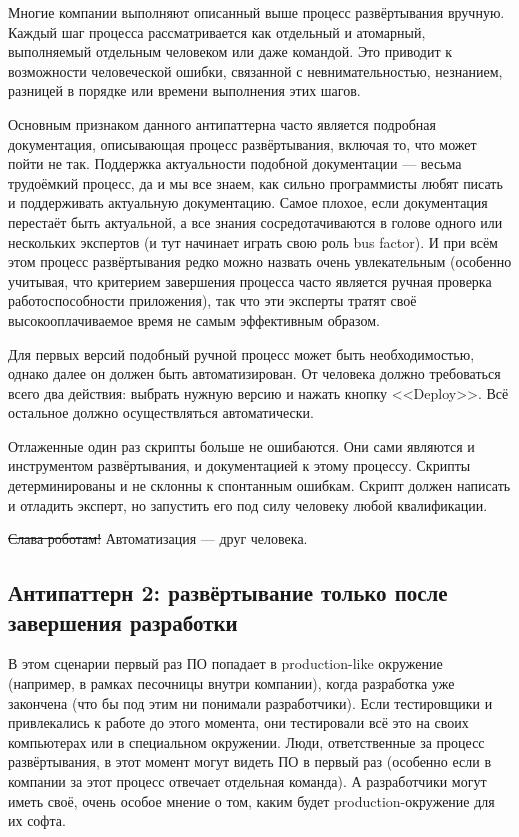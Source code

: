 \documentclass{../../text-style}
\begin{document}
Многие компании выполняют описанный выше процесс развёртывания вручную. Каждый шаг процесса рассматривается как отдельный и атомарный, выполняемый отдельным человеком или даже командой. Это приводит к возможности человеческой ошибки, связанной с невнимательностью, незнанием, разницей в порядке или времени выполнения этих шагов.

Основным признаком данного антипаттерна часто является подробная документация, описывающая процесс развёртывания, включая то, что может пойти не так. Поддержка актуальности подобной документации --- весьма трудоёмкий процесс, да и мы все знаем, как сильно программисты любят писать и поддерживать актуальную документацию. Самое плохое, если документация перестаёт быть актуальной, а все знания сосредотачиваются в голове одного или нескольких экспертов (и тут начинает играть свою роль bus factor). И при всём этом процесс развёртывания редко можно назвать очень увлекательным (особенно учитывая, что критерием завершения процесса часто является ручная проверка работоспособности приложения), так что эти эксперты тратят своё высокооплачиваемое время не самым эффективным образом.

Для первых версий подобный ручной процесс может быть необходимостью, однако далее он должен быть автоматизирован. От человека должно требоваться всего два действия: выбрать нужную версию и нажать кнопку <<Deploy>>. Всё остальное должно осуществляться автоматически.

Отлаженные один раз скрипты больше не ошибаются. Они сами являются и инструментом развёртывания, и документацией к этому процессу. Скрипты детерминированы и не склонны к спонтанным ошибкам. Скрипт должен написать и отладить эксперт, но запустить его под силу человеку любой квалификации.

\sout{Слава роботам!} Автоматизация --- друг человека.

\subsection{Антипаттерн 2: развёртывание только после завершения разработки}

В этом сценарии первый раз ПО попадает в production-like окружение (например, в рамках песочницы внутри компании), когда разработка уже закончена (что бы под этим ни понимали разработчики). Если тестировщики и привлекались к работе до этого момента, они тестировали всё это на своих компьютерах или в специальном окружении. Люди, ответственные за процесс развёртывания, в этот момент могут видеть ПО в первый раз (особенно если в компании за этот процесс отвечает отдельная команда). А разработчики могут иметь своё, очень особое мнение о том, каким будет production-окружение для их софта.
\end{document}
